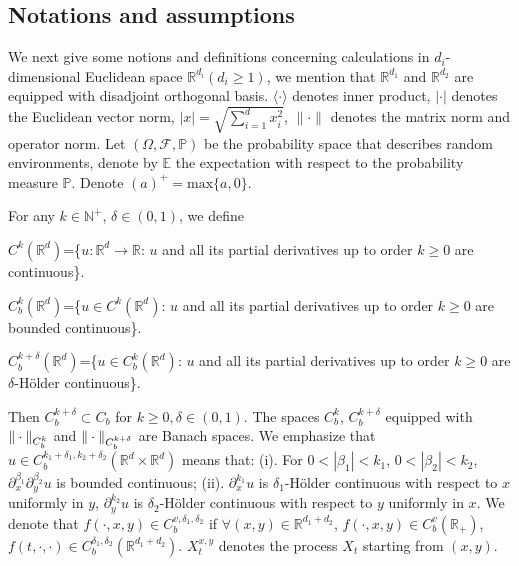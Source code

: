\documentclass[11pt,reqno]{amsart}
\numberwithin{equation}{section}
\newcommand{\de}{\delta}
\begin{document}
\subsection{Notations and assumptions}
We next give some notions and definitions concerning calculations in $d_{i}$-dimensional Euclidean space $\mathbb{R}^{d_{i} }(d_{i}\geq 1) $, we mention that  $\mathbb{R}^{d_{1} }$ and $\mathbb{R}^{d_{2}}$ are equipped with disadjoint orthogonal basis. 
$\langle \cdot \rangle $ denotes inner product, $|\cdot|$ denotes the Euclidean vector norm, $|x|=\sqrt{\sum_{i=1}^{d} x_i^{2}}$, $\|\cdot\|$ denotes the matrix norm and operator norm. 
Let $(\Omega,\mathcal{F},\mathbb{P})$ be the probability space  that describes random environments, denote by $ \mathbb{E}$ the expectation with respect to the probability measure $\mathbb{P}$. Denote $(a)^{+}=\text{max}\{a, 0\}$.

For any $ k\in \mathbb{N}^+$, $\delta\in (0,1)$, we define

$ C^{k}(\mathbb{R}^{d} )$=\{$u:\mathbb{R}^{d}\longrightarrow \mathbb{R}$: $u$ and all its partial derivatives up to order $k\geq0$ are continuous\}.

$ C^{k}_{b}(\mathbb{R}^{d} )$=\{$u\in  C^{k}(\mathbb{R}^{d})$: $u$ and all its partial derivatives up to order $k\geq0$ are bounded continuous\}.

$ C^{k+\delta}_{b}(\mathbb{R}^{d} )$=\{$u\in  C^{k}_{b}(\mathbb{R}^{d})$: $u$ and all its  partial derivatives up to order $k\geq0$ are $\delta$-H\"{o}lder continuous\}.

Then $ C_b^{k+\de}\subset C_b$ for $k\geq0,  \de\in(0,1)$. The spaces $ C^{k}_{b}$, $C^{k+\delta}_{b}$  equipped with $\Arrowvert \cdot\Arrowvert_{C^{k}_{b}}$ and $\Arrowvert \cdot\Arrowvert_{C^{k+\delta}_{b}}$ are Banach spaces. We emphasize that $u\in C^{k_{1}+\delta_{1},k_{2}+\delta_{2}}_{b}(\mathbb{R}^{d}\times\mathbb{R}^{d} )$ means that: 
(i). For $0<|\beta_{1}|<k_{1}$,  $0<|\beta_{2}|<k_{2}$, $\partial_{x}^{\beta_{1}}\partial_{y}^{\beta_{2}}u$ is bounded continuous; (ii).  $\partial_{x}^{k_{1}}u$ is $\delta_{1}$-H\"{o}lder continuous with respect to $x$ uniformly in $y$,   $\partial_{y}^{k_{2}}u$ is $\delta_{2}$-H\"{o}lder continuous with respect to $y$ uniformly in $x$. We denote that $f(\cdot,x,y)\in C_{b}^{v,\delta_{1},\delta_{2}}$ if $\forall (x,y)\in \mathbb{R}^{d_{1}+d_{2}}$, $f(\cdot,x,y)\in C_{b}^{v}(\mathbb{R_{+}})$, $f(t,\cdot,\cdot)\in C_{b}^{\delta_{1},\delta_{2}}(\mathbb{R}^{d_{1}+d_{2}})$. $X^{x,y}_{t}$  denotes the process $X_{t}$ starting from $(x,y)$. 
\end{document}
